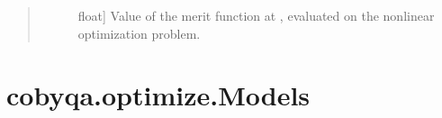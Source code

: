 \documentclass[letterpaper,10pt,english]{sphinxmanual}
\begin{document}
\begin{fulllineitems}
\begin{fulllineitems}
\begin{quote}
\begin{description}
\begin{description}
\item[{}] \leavevmode{[}float{]}
\sphinxAtStartPar
Value of the merit function at , evaluated on the nonlinear
optimization problem.

\end{description}

\end{description}\end{quote}

\end{fulllineitems}


\end{fulllineitems}



\section{cobyqa.optimize.Models}
\label{\detokenize{refs/generated/cobyqa.optimize.Models:cobyqa-optimize-models}}\label{\detokenize{refs/generated/cobyqa.optimize.Models::doc}}
\end{document}
